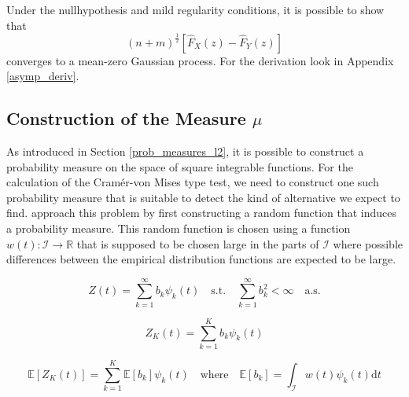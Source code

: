 \documentclass[12pt, a4paper]{article}
\theoremstyle{MAstyle} \newtheorem{assumption}{Assumption}[section]
\theoremstyle{MAstyle} \newtheorem{definition}{Definition}[section]
\theoremstyle{MAstyle} \newtheorem{theorem}{Theorem}[section]
\begin{document}
			Under the nullhypothesis and mild regularity conditions, it is possible to show that 
			\begin{equation}
				(n+m)^{\frac{1}{2}} \left[\hat{F}_X(z) - \hat{F}_Y(z)\right]
			\end{equation}
			converges to a mean-zero Gaussian process. For the derivation look in Appendix \ref{asymp_deriv}.
		
		\subsection{Construction of the Measure $\mu$}\label{mu}
			As introduced in Section \ref{prob_measures_l2}, it is possible to construct a probability measure on the space of square integrable functions. For the calculation of the Cram\'{e}r-von Mises type test, we need to construct one such probability measure that is suitable to detect the kind of alternative we expect to find.
			\cite{bugni_permutation_2021} approach this problem by first constructing a random function that induces a probability measure. This random function is chosen using a function $w(t):\mathcal{I} \rightarrow \mathbb{R}$ that is supposed to be chosen large in the parts of $\mathcal{I}$ where possible differences between the empirical distribution functions are expected to be large.
			
			\begin{equation}\label{non_truncated}
				Z(t) = \sum_{k = 1}^{\infty} b_k \psi_k(t)
				\quad \text{s.t.} \quad
				\sum_{k = 1}^{\infty} b_k^2 < \infty \quad \text{a.s.}
			\end{equation}

			\begin{equation}\label{truncation}
				Z_K(t) = \sum_{k = 1}^{K} b_k \psi_k(t)
			\end{equation}
		
			\begin{equation}
				\mathbb{E}\left[Z_K(t)\right] = \sum_{k = 1}^{K} \mathbb{E}\left[b_k\right] \psi_k(t)
				\quad \text{where} \quad
				\mathbb{E}\left[b_k\right] = \int_{\mathcal{I}}w(t)\psi_k(t) \mathrm{d}t
			\end{equation}
		
\end{document}
